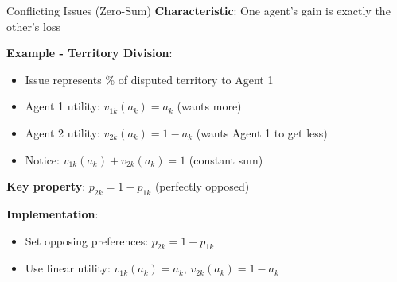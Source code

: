 \documentclass{beamer}
\begin{document}
\begin{frame}{Conflicting Issues (Zero-Sum)}
\textbf{Characteristic}: One agent's gain is exactly the other's loss

\vspace{0.3cm}

\textbf{Example - Territory Division}:
\begin{itemize}
    \item Issue represents \% of disputed territory to Agent 1
    \item Agent 1 utility: $v_{1k}(a_k) = a_k$ (wants more)
    \item Agent 2 utility: $v_{2k}(a_k) = 1 - a_k$ (wants Agent 1 to get less)
    \item Notice: $v_{1k}(a_k) + v_{2k}(a_k) = 1$ (constant sum)
\end{itemize}

\vspace{0.3cm}

\textbf{Key property}: $p_{2k} = 1 - p_{1k}$ (perfectly opposed)

\vspace{0.3cm}

\textbf{Implementation}:
\begin{itemize}
    \item Set opposing preferences: $p_{2k} = 1 - p_{1k}$
    \item Use linear utility: $v_{1k}(a_k) = a_k$, $v_{2k}(a_k) = 1-a_k$
\end{itemize}
\end{frame}
\end{document}
